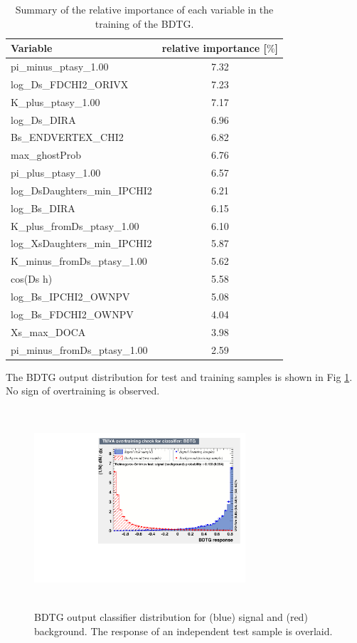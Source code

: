 \begin{table}[h]
\centering
 \begin{tabular}{l c}
Variable & relative importance [$\%$]\\
  \hline
pi\_minus\_ptasy\_1.00 & 7.32\\
log\_Ds\_FDCHI2\_ORIVX & 7.23\\
K\_plus\_ptasy\_1.00 & 7.17\\
log\_Ds\_DIRA & 6.96\\
Bs\_ENDVERTEX\_CHI2 & 6.82\\
max\_ghostProb & 6.76\\
pi\_plus\_ptasy\_1.00 & 6.57\\
log\_DsDaughters\_min\_IPCHI2 & 6.21\\
log\_Bs\_DIRA & 6.15\\
K\_plus\_fromDs\_ptasy\_1.00 & 6.10\\
log\_XsDaughters\_min\_IPCHI2 & 5.87\\
K\_minus\_fromDs\_ptasy\_1.00 & 5.62\\
cos(Ds h) & 5.58\\
log\_Bs\_IPCHI2\_OWNPV & 5.08\\
log\_Bs\_FDCHI2\_OWNPV & 4.04\\
Xs\_max\_DOCA & 3.98\\
pi\_minus\_fromDs\_ptasy\_1.00 & 2.59\\
\end{tabular}
\caption{Summary of the relative importance of each variable in the training of the BDTG.}
\label{table:InputVars}
\end{table}

 
The BDTG output distribution for test and training samples is shown in Fig \ref{fig:BDT_Response}. No sign of overtraining is observed. 

\begin{figure}[h]
\includegraphics[height=7.4cm,width=0.7\textwidth]{figs/BDT_Response.pdf}
\caption{BDTG output classifier distribution for (blue) signal and (red) background. The response of an independent test sample is overlaid.}
\label{fig:BDT_Response}
\end{figure}


